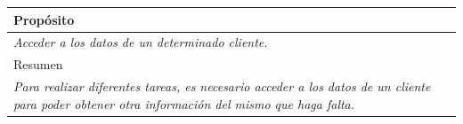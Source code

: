 \begin{table}[H]
\begin{tabular}{|llllllll|}
    \multicolumn{8}{|l|}{\cellcolor[HTML]{F2F2F2}Propósito}                                                                                                                                                                          \\ \hline
    \multicolumn{8}{|p{15cm}|}{{\color[HTML]{808080} \textit{Acceder a los datos de un determinado cliente.}}}                                                                                                           \\ \hline
    \multicolumn{8}{|l|}{\cellcolor[HTML]{F2F2F2}Resumen}                                                                                                                                                                            \\ \hline
    \multicolumn{8}{|p{15cm}|}{{\color[HTML]{808080} \textit{Para realizar diferentes tareas, es necesario acceder a los datos de un cliente para poder obtener otra información del mismo que haga falta.}}} \\ \hline
    \end{tabular}
\end{table}



